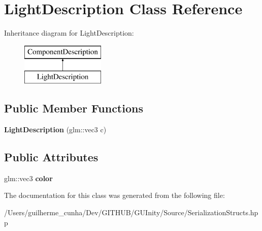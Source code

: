 \hypertarget{class_light_description}{}\section{Light\+Description Class Reference}
\label{class_light_description}
Inheritance diagram for Light\+Description\+:\begin{figure}[H]
\begin{center}
\leavevmode
\includegraphics[height=2.000000cm]{class_light_description}
\end{center}
\end{figure}
\subsection*{Public Member Functions}
\begin{DoxyCompactItemize}
\item 
\hypertarget{class_light_description_a216ef61130302902263498c87e7f17f9}{}{\bfseries Light\+Description} (glm\+::vec3 c)\label{class_light_description_a216ef61130302902263498c87e7f17f9}

\end{DoxyCompactItemize}
\subsection*{Public Attributes}
\begin{DoxyCompactItemize}
\item 
\hypertarget{class_light_description_ae85428dbc4e27aca3038a8caaaf73d4e}{}glm\+::vec3 {\bfseries color}\label{class_light_description_ae85428dbc4e27aca3038a8caaaf73d4e}

\end{DoxyCompactItemize}


The documentation for this class was generated from the following file\+:\begin{DoxyCompactItemize}
\item 
/\+Users/guilherme\+\_\+cunha/\+Dev/\+G\+I\+T\+H\+U\+B/\+G\+U\+Inity/\+Source/Serialization\+Structs.\+hpp\end{DoxyCompactItemize}

